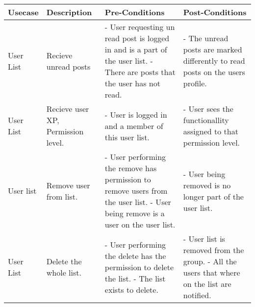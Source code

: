 \documentclass{report}
\begin{document}
	\begin{table}[h]
		\begin{tabular}{@{}|p{2cm}|p{3cm}|p{4cm}|p{4cm}|@{}}
			\toprule
			Usecase & 
			Description & 
			Pre-Conditions & 
			Post-Conditions \\ \midrule			
			
			
			User List 
			& Recieve unread posts 
			& - User requesting un read post is logged in and is a part of the user list. \newline 
			- There are posts that the user has not read. 
			& - The unread posts are marked differently to read posts on the users profile. \\ \midrule
			
			User List 
			& Recieve user XP, Permission level. 
			& - User is logged in and a member of this user list. 
			& - User sees the functionallity assigned to that permission level. \\ \midrule
			
			User list 
			& Remove user from list. 
			& - User performing the remove has permission to remove users from the user list. \newline 
			- User being remove is a user on the user list. 
			& - User being removed is no longer part of the user list. \\ \midrule
			
			User List 
			& Delete the whole list. 
			& - User performing the delete has the permission to delete the list. \newline 
			- The list exists to delete. 
			& - User list is removed from the group. \newline 
			- All the users that where on the list are notified.  \\ \bottomrule
		\end{tabular}
	\end{table}
\end{document}
